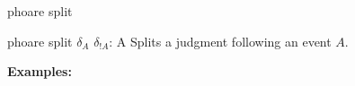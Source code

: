 \begin{tactic}{phoare split}
  \begin{tsyntax}{phoare split $\delta_{A}$ $\delta_{!A}$: A}
  Splits a \phl judgment following an event $A$.

  \textbf{Examples:}
  \begin{mathpar}
    {}%
    \quad{} \\%
  \end{mathpar}
  \end{tsyntax}  
\end{tactic}
